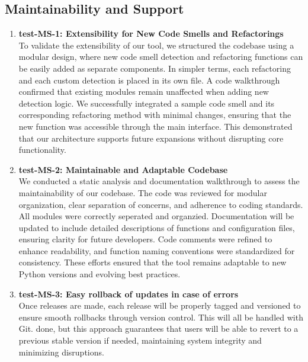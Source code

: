 \documentclass[12pt, titlepage]{article}
\begin{document}
\subsection{Maintainability and Support}
\begin{enumerate}

\item \textbf{test-MS-1: Extensibility for New Code Smells and Refactorings} \\[2mm]
To validate the extensibility of our tool, we structured the codebase using a modular design, where new code smell detection and refactoring functions can 
be easily added as separate components. In simpler terms, each refactoring and each custom detection is placed in its own file. A code walkthrough confirmed that 
existing modules remain unaffected when adding new detection logic. We successfully integrated a sample code smell and its corresponding refactoring method with 
minimal changes, ensuring that the new function was accessible through the main interface. This demonstrated that our architecture supports future expansions without 
disrupting core functionality.

\item \textbf{test-MS-2: Maintainable and Adaptable Codebase} \\[2mm]
We conducted a static analysis and documentation walkthrough to assess the maintainability of our codebase. The code was reviewed for modular organization, clear separation 
of concerns, and adherence to coding standards. All modules were correctly seperated and organzied. Documentation will be updated to include detailed descriptions of functions 
and configuration files, ensuring clarity for future developers. Code comments were refined to enhance readability, and function naming conventions were standardized for 
consistency. These efforts ensured that the tool remains adaptable to new Python versions and evolving best practices.

\item \textbf{test-MS-3: Easy rollback of updates in case of errors} \\[2mm]
Once releases are made, each release will be properly tagged and versioned to ensure smooth rollbacks through version control. This will all be handled with Git. done, but 
this approach guarantees that users will be able to revert to a previous stable version if needed, maintaining system integrity and minimizing disruptions.
\end{enumerate}
\end{document}
